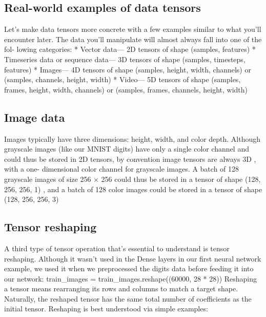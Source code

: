 \documentclass[11pt]{article}
\begin{document}
    \hypertarget{real-world-examples-of-data-tensors}{%
\subsection{Real-world examples of data
tensors}\label{real-world-examples-of-data-tensors}}

Let's make data tensors more concrete with a few examples similar to
what you'll encounter later. The data you'll manipulate will almost
always fall into one of the fol- lowing categories: * Vector data--- 2D
tensors of shape (samples, features) * Timeseries data or sequence
data--- 3D tensors of shape (samples, timesteps, features) * Images---
4D tensors of shape (samples, height, width, channels) or (samples,
channels, height, width) * Video--- 5D tensors of shape (samples,
frames, height, width, channels) or (samples, frames, channels, height,
width)

\hypertarget{image-data}{%
\subsection{Image data}\label{image-data}}

Images typically have three dimensions: height, width, and color depth.
Although grayscale images (like our MNIST digits) have only a single
color channel and could thus be stored in 2D tensors, by convention
image tensors are always 3D , with a one- dimensional color channel for
grayscale images. A batch of 128 grayscale images of size 256 × 256
could thus be stored in a tensor of shape (128, 256, 256, 1) , and a
batch of 128 color images could be stored in a tensor of shape (128,
256, 256, 3)

    \hypertarget{tensor-reshaping}{%
\subsection{Tensor reshaping}\label{tensor-reshaping}}

A third type of tensor operation that's essential to understand is
tensor reshaping. Although it wasn't used in the Dense layers in our
first neural network example, we used it when we preprocessed the digits
data before feeding it into our network: train\_images =
train\_images.reshape((60000, 28 * 28)) Reshaping a tensor means
rearranging its rows and columns to match a target shape. Naturally, the
reshaped tensor has the same total number of coefficients as the initial
tensor. Reshaping is best understood via simple examples:
\end{document}
